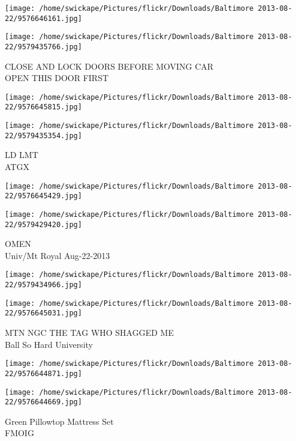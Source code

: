 \documentclass[10pt,letterpaper]{article}
\begin{document}
\texttt{[image: /home/swickape/Pictures/flickr/Downloads/Baltimore 2013-08-22/9576646161.jpg]}

\vspace{0.25in}
\texttt{[image: /home/swickape/Pictures/flickr/Downloads/Baltimore 2013-08-22/9579435766.jpg]}

CLOSE AND LOCK DOORS BEFORE MOVING CAR\\
OPEN THIS DOOR FIRST\\
\pagebreak

\texttt{[image: /home/swickape/Pictures/flickr/Downloads/Baltimore 2013-08-22/9576645815.jpg]}

\vspace{0.25in}
\texttt{[image: /home/swickape/Pictures/flickr/Downloads/Baltimore 2013-08-22/9579435354.jpg]}

LD LMT\\
ATGX\\
\pagebreak

\texttt{[image: /home/swickape/Pictures/flickr/Downloads/Baltimore 2013-08-22/9576645429.jpg]}

\vspace{0.25in}
\texttt{[image: /home/swickape/Pictures/flickr/Downloads/Baltimore 2013-08-22/9579429420.jpg]}

OMEN\\
Univ/Mt Royal Aug{-}22{-}2013\\
\pagebreak

\texttt{[image: /home/swickape/Pictures/flickr/Downloads/Baltimore 2013-08-22/9579434966.jpg]}

\vspace{0.25in}
\texttt{[image: /home/swickape/Pictures/flickr/Downloads/Baltimore 2013-08-22/9576645031.jpg]}

MTN NGC THE TAG WHO SHAGGED ME\\
Ball So Hard University\\
\pagebreak

\texttt{[image: /home/swickape/Pictures/flickr/Downloads/Baltimore 2013-08-22/9576644871.jpg]}

\vspace{0.25in}
\texttt{[image: /home/swickape/Pictures/flickr/Downloads/Baltimore 2013-08-22/9576644669.jpg]}

Green Pillowtop Mattress Set\\
FMOIG\\
\pagebreak
\end{document}
